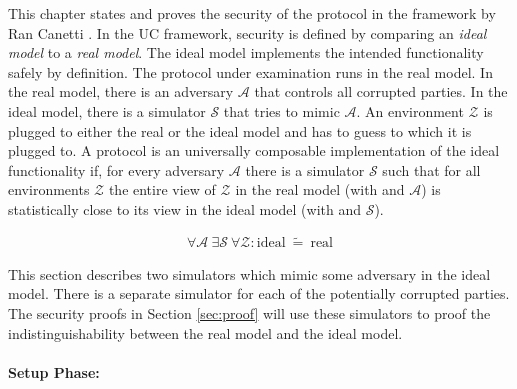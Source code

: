 \label{sec:security}

This chapter states and proves the security of the protocol in the
 framework by Ran Canetti \cite{canetti05}.
In the UC framework, security is defined by comparing an \emph{ideal model} to a
\emph{real model}. The ideal model implements the intended functionality
\JWfuncSym{}{} safely by definition. The protocol under examination runs in the
real model. In the real model, there is an adversary $\mathcal{A}$ that controls
all corrupted parties.  In the ideal model, there is a simulator $\mathcal{S}$
that tries to mimic $\mathcal{A}$. An environment $\mathcal{Z}$ is plugged to
either the real or the ideal model and has to guess to which it is plugged to. A
protocol \JWprotoSym{}{} is an universally composable implementation of the
ideal functionality if, for every adversary $\mathcal{A}$ there is a
simulator $\mathcal{S}$ such that for all environments $\mathcal{Z}$ the entire
view of $\mathcal{Z}$ in the real model (with \JWprotoSym{}{} and $\mathcal{A}$)
is statistically close to its view in the ideal model (with \JWfuncSym{}{} and
$\mathcal{S}$).

\begin{align*}
%
\forall \mathcal{A}\ \exists \mathcal{S}\ \forall \mathcal{Z} :
\text{ideal}\ \widetilde{=}\ \text{real}
%
\end{align*}

%
%


%
%
\label{sec:simulators}

This section describes two simulators which mimic some adversary \JWadv{} in the
ideal model. There is a separate simulator for each of the potentially corrupted
parties. The security proofs in Section \ref{sec:proof} will use these
simulators to proof the indistinguishability between the real model and the
ideal model.

\label{sec:simulator-david}

\paragraph{Setup Phase:}

